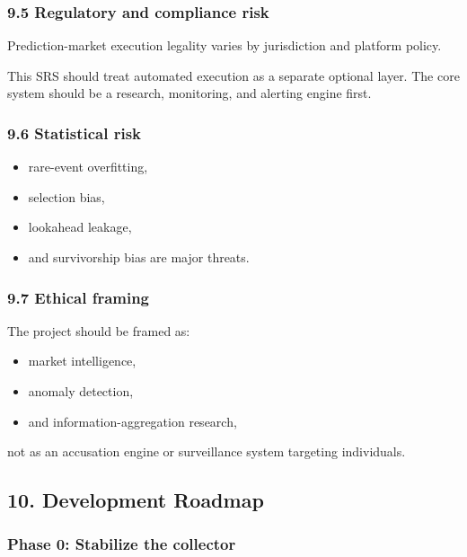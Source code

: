 \documentclass[
]{article}
\providecommand{\tightlist}{%
  \setlength{\itemsep}{0pt}\setlength{\parskip}{0pt}}
\begin{document}
\subsubsection{9.5 Regulatory and compliance
risk}\label{95-regulatory-and-compliance-risk}

Prediction-market execution legality varies by jurisdiction and platform
policy.

This SRS should treat automated execution as a separate optional layer.
The core system should be a research, monitoring, and alerting engine
first.

\subsubsection{9.6 Statistical risk}\label{96-statistical-risk}

\begin{itemize}
\tightlist
\item
  rare-event overfitting,
\item
  selection bias,
\item
  lookahead leakage,
\item
  and survivorship bias are major threats.
\end{itemize}

\subsubsection{9.7 Ethical framing}\label{97-ethical-framing}

The project should be framed as:

\begin{itemize}
\tightlist
\item
  market intelligence,
\item
  anomaly detection,
\item
  and information-aggregation research,
\end{itemize}

not as an accusation engine or surveillance system targeting
individuals.

\subsection{10. Development Roadmap}\label{10-development-roadmap}

\subsubsection{Phase 0: Stabilize the
collector}\label{phase-0-stabilize-the-collector}
\end{document}
